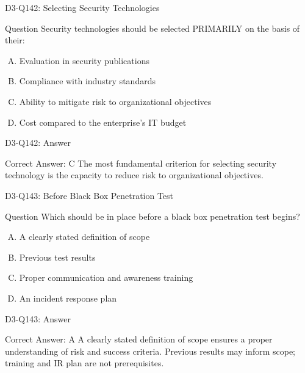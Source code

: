 \documentclass{beamer}
\begin{document}
	\begin{frame}{D3-Q142: Selecting Security Technologies}
		\begin{block}{Question}
			Security technologies should be selected PRIMARILY on the basis of their:
		\end{block}
		\begin{enumerate}[(A)]
			\item Evaluation in security publications
			\item Compliance with industry standards
			\item Ability to mitigate risk to organizational objectives
			\item Cost compared to the enterprise's IT budget
		\end{enumerate}
	\end{frame}
	\begin{frame}{D3-Q142: Answer}
		\begin{block}{Correct Answer: C}
			The most fundamental criterion for selecting security technology is the capacity to reduce risk to organizational objectives.
		\end{block}
	\end{frame}
	
	\begin{frame}{D3-Q143: Before Black Box Penetration Test}
		\begin{block}{Question}
			Which should be in place before a black box penetration test begins?
		\end{block}
		\begin{enumerate}[(A)]
			\item A clearly stated definition of scope
			\item Previous test results
			\item Proper communication and awareness training
			\item An incident response plan
		\end{enumerate}
	\end{frame}
	\begin{frame}{D3-Q143: Answer}
		\begin{block}{Correct Answer: A}
			A clearly stated definition of scope ensures a proper understanding of risk and success criteria. Previous results may inform scope; training and IR plan are not prerequisites.
		\end{block}
	\end{frame}
	
\end{document}
